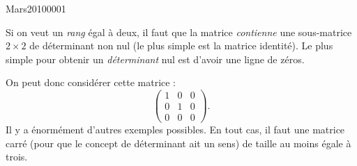 

\begin{corrige}{Mars20100001}

	Si on veut un \emph{rang} égal à deux, il faut que la matrice \emph{contienne} une sous-matrice $2\times 2$ de déterminant non nul (le plus simple est la matrice identité). Le plus simple pour obtenir un \emph{déterminant} nul est d'avoir une ligne de zéros.

	On peut donc considérer cette matrice :
	\begin{equation}
		\begin{pmatrix}
			1	&	0	&	0	\\
			0	&	1	&	0	\\
			0	&	0	&	0
		\end{pmatrix}.
	\end{equation}
	Il y a énormément d'autres exemples possibles. En tout cas, il faut une matrice carré (pour que le concept de déterminant ait un sens) de taille au moins égale à trois.

\end{corrige}
